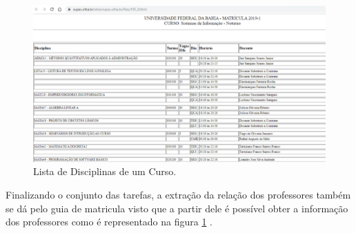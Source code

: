 \documentclass[12pt, a4paper]{report}
\begin{document}
\begin{figure}[ht!]
\centering
\includegraphics[scale=0.8]{disciplinas.png}
\caption{Lista de Disciplinas de um Curso.}
\label{fig:disciplinas}
\end{figure}

Finalizando o conjunto das tarefas, a extração da relação dos professores também se dá pelo guia de matricula visto que a partir dele é possível obter a informação dos professores como é representado na figura \ref{fig:disciplinas} . 
\end{document}
